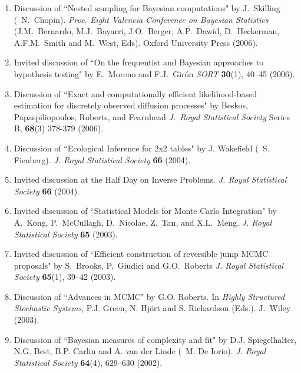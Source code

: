 \begin{enumerate}
\item Discussion of ``Nested sampling for Bayesian computations" by J.~Skilling (\avec\ N.~Chopin).
{\it  Proc. Eight Valencia Conference on Bayesian Statistics}
(J.M.~Bernardo, M.J.~Bayarri, J.O.~Berger, A.P.~Dawid, D.~Heckerman, A.F.M.~Smith and M.~West, Eds).
Oxford University Press (2006).

\item Invited discussion of ``On the frequentist and Bayesian approaches to 
hypothesis testing" by E.~Moreno and F.J.~Gir\'on {\em SORT} {\bf 30}(1), 40--45 (2006).

\item Discussion of ``Exact and computationally efficient likelihood-based estimation 
for discretely observed diffusion processes" by Beskos, Papaspiliopoulos, Roberts, and Fearnhead
{\em J.~Royal Statistical Society} Series B, {\bf 68}(3) 378-379 (2006).

\item Discussion of ``Ecological Inference for 2x2 tables"
by J. Wakefield (\avec\ S. Fienberg). {\it J. Royal Statistical Society} {\bf 66} (2004). 

\item Invited discussion at the Half Day on Inverse Problems.
{\it J. Royal Statistical Society} {\bf 66} (2004).

\item Invited discussion of ``Statistical Models for Monte Carlo Integration"
by A.~Kong, P.~McCullagh, D.~Nicolae, Z.~Tan, and X.L.~Meng.
{\it J. Royal Statistical Society} {\bf 65} (2003).

\item Invited discussion of ``Efficient construction of reversible jump MCMC proposals"
by S.~Brooks, P.~Giudici and G.O.~Roberts {\it J. Royal Statistical Society} {\bf 65}(1), 
39--42 (2003).

\item Discussion of ``Advances in MCMC"
by G.O. Roberts. In {\it Highly Structured Stochastic Systems},
P.J. Green, N. Hj\"ort and S. Richardson (Eds.). J.~Wiley (2003).

 
\item Discussion of ``Bayesian measures of complexity
and fit" by D.J. Spiegelhalter, N.G. Best, B.P. Carlin
and A. van der Linde (\avec\ M. De Iorio). 
{\it J. Royal Statistical Society} {\bf 64}(4), 629--630 (2002).


\end{enumerate}
